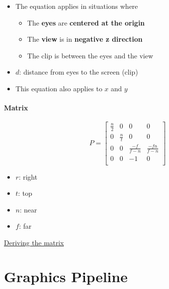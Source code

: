       \begin{itemize}
        \item The equation applies in situations where
        \begin{itemize}
          \item The \textbf{eyes} are \textbf{centered at the origin}
          \item The \textbf{view} is in \textbf{negative z direction}
          \item The clip is between the eyes and the view
        \end{itemize}

        \item $ d $: distance from eyes to the screen (clip)
        \item This equation also applies to $ x $ and $ y $
      \end{itemize}

      \paragraph{Matrix}
      \begin{equation}
        P =
        \begin{bmatrix}
          \frac{n}{2} & 0 & 0 & 0 \\
          0 & \frac{n}{t} & 0 & 0 \\
          0 & 0 & \frac{-f}{f - n} & \frac{-fn}{f - n} \\
          0 & 0 & -1 & 0 \\
        \end{bmatrix}
      \end{equation}

      \begin{itemize}
        \item $ r $: right
        \item $ t $: top
        \item $ n $: near
        \item $ f $: far
      \end{itemize}

      \href{http://www.songho.ca/opengl/gl_projectionmatrix.html}{Deriving
      the matrix}

\section{Graphics Pipeline}

